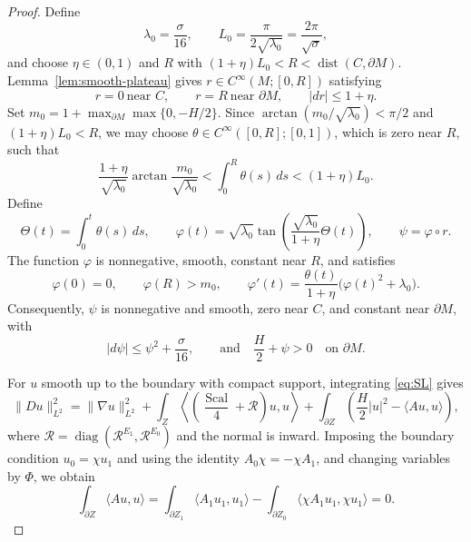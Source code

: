 \documentclass[12pt,reqno]{amsart}
\numberwithin{equation}{section}
\theoremstyle{definition}
\newcommand{\Sc}{\operatorname{Scal}}
\newcommand{\dist}{\operatorname{dist}}
\newcommand{\cR}{\mathcal R}
\begin{document}
\begin{proof}
Define 
\[
 \lambda_0=\frac{\sigma}{16},\qquad
 L_0=\frac{\pi}{2\sqrt{\lambda_0}}
     =\frac{2\pi}{\sqrt\sigma},
\]
and choose $\eta\in(0,1)$ and $R$ with
$(1+\eta)L_0<R<\dist(C,\partial M)$.
Lemma~\ref{lem:smooth-plateau} gives
$r\in C^\infty(M;[0,R])$ satisfying
\[
 r=0\ \text{near }C,\qquad
 r=R\ \text{near }\partial M,\qquad |dr|\leq1+\eta.
\]
Set $m_0=1+\max_{\partial M}\max\{0,-H/2\}$.
Since $\arctan(m_0/\sqrt{\lambda_0})<\pi/2$ and
$(1+\eta)L_0<R$, we may choose
$\theta\in C^\infty([0,R];[0,1])$, which is zero near $R$, such that
\[
 \frac{1+\eta}{\sqrt{\lambda_0}}
   \arctan\frac{m_0}{\sqrt{\lambda_0}}
 <\int_0^R\theta(s)\,ds<(1+\eta)L_0.
\]
Define
\[
 \Theta(t)=\int_0^t\theta(s)\,ds,\qquad
 \varphi(t)=\sqrt{\lambda_0}\tan\left(
  \frac{\sqrt{\lambda_0}}{1+\eta}\Theta(t)\right),
 \qquad \psi=\varphi\circ r.
\]
The function $\varphi$ is
nonnegative, smooth, constant near $R$, and satisfies
\[
 \varphi(0)=0,\qquad \varphi(R)>m_0,\qquad
 \varphi'(t)=\frac{\theta(t)}{1+\eta}
              \bigl(\varphi(t)^2+\lambda_0\bigr).
\]
Consequently, $\psi$ is nonnegative and smooth, zero near $C$,
and constant near $\partial M$, with
\begin{equation}\label{eq:psi-estimates}
 |d\psi|\leq\psi^2+\frac{\sigma}{16},
 \qquad\text{and}\quad 
 \frac H2+\psi>0\quad\text{on }\partial M.
\end{equation}


For $u$ smooth up to the boundary with compact support, integrating
\eqref{eq:SL} gives
\[
 \|Du\|_{L^2}^2
 =\|\nabla u\|_{L^2}^2
  +\int_Z\left\langle
   \left(\frac{\Sc}{4}+\cR\right)u,u\right\rangle
  +\int_{\partial Z}\left(\frac H2|u|^2-\langle Au,u\rangle\right),
\]
where $\cR=\operatorname{diag}(\cR^{E_1},\cR^{E_0})$ and the
normal is inward.  Imposing the boundary condition $u_0=\chi u_1$ and using the identity
$A_0\chi=-\chi A_1$, and changing variables by $\Phi$, we obtain
\[
 \int_{\partial Z}\langle Au,u\rangle
 =\int_{\partial Z_1}\langle A_1u_1,u_1\rangle
  -\int_{\partial Z_0}\langle\chi A_1u_1,\chi u_1\rangle=0.
\]


\end{proof}
\end{document}
